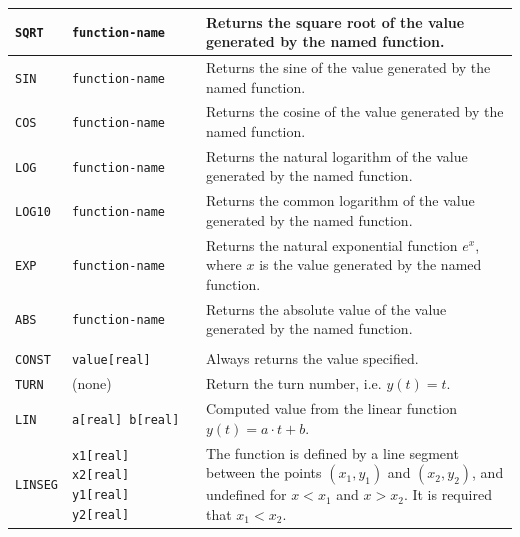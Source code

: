 \begin{center}
\begin{longtable}{|p{1.8cm} | p{4.1cm} | p{9.5cm}|}
    \texttt{SQRT} & \texttt{function-name} &
    Returns the square root\index{square root} of the value generated by the named function. \\*
    \hline

    \texttt{SIN} & \texttt{function-name} &
    Returns the sine\index{sine} of the value generated by the named function. \\*
    \hline

    \texttt{COS} & \texttt{function-name} &
    Returns the cosine\index{cosine} of the value generated by the named function. \\*
    \hline

    \texttt{LOG} & \texttt{function-name} &
    Returns the natural logarithm\index{natural logarithm} of the value generated by the named function. \\*
    \hline

    \texttt{LOG10} & \texttt{function-name} &
    Returns the common logarithm\index{lograithm} of the value generated by the named function. \\*
    \hline

    \texttt{EXP} & \texttt{function-name} &
    Returns the natural exponential\index{exponential fucntion} function $e^x$, where $x$ is the value generated by the named function. \\
    \hline

    \texttt{ABS} & \texttt{function-name} &
    Returns the absolute value\index{absolute value} of the value generated by the named function. \\
    \hline

    \rowcolor{blue!15}
    \multicolumn{3}{|l|}{Polynomial\index{polynomial function} and elliptical functions} \\*
    \hline

    \texttt{CONST} & \texttt{value[real]} &
    Always returns the value specified.\\*
    \hline

    \texttt{TURN} & (none) &
    Return the turn number, i.e. $y(t) = t$.\\*
    \hline

    \texttt{LIN} & \texttt{a[real] b[real]} &
    Computed value from the linear function $y(t) = a\cdot t + b$. \\*
    \hline

    \texttt{LINSEG} & \texttt{x1[real] x2[real] y1[real] y2[real]} &
    The function is defined by a line segment between the points $(x_1,y_1)$ and $(x_2,y_2)$, and undefined for $x < x_1$ and $x>x_2$.
    It is required that $x_1 < x_2$.\\*
    \hline


\end{longtable}
\end{center}
